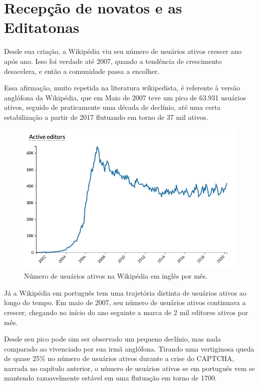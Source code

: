 \section{Recepção de novatos e as Editatonas}

Desde sua criação, a Wikipédia viu seu número de usuários ativos crescer ano após ano. Isso foi verdade até 2007, quando a tendência de crescimento desacelera, e então a comunidade passa a encolher.  \citep{halfaker_rise_2013}

Essa afirmação, muito repetida na literatura wikipedista, é referente à versão anglófona da Wikipédia, que em Maio de 2007 teve um pico de 63.931 usuários ativos, seguido de praticamente uma década de declínio, até uma certa estabilização a partir de 2017 flutuando em torno de 37 mil ativos. \citep{wikimedia_stats_active_editors_enwiki_2020}

\begin{figure}[hbt]
    \centering
    \includegraphics[width=1\textwidth]{Images/active_editors_enwiki.png}
    \caption{Número de usuários ativos na Wikipédia em inglês por mês. \citep{wikimedia_stats_active_editors_enwiki_2020} }
    \label{fig:active_editors_enwiki}
\end{figure}

Já a Wikipédia em português tem uma trajetória distinta de usuários ativos ao longo do tempo. Em maio de 2007, seu número de usuários ativos continuava a crescer, chegando no início do ano seguinte a marca de 2 mil editores ativos por mês. \citep{wikimedia_stats_active_editors_ptwiki_2020}

Desde seu pico pode sim ser observado um pequeno declínio, mas nada comparado ao vivenciado por sua irmã anglófona. Tirando uma vertiginosa queda de quase 25\% no número de usuários ativos durante a crise do CAPTCHA, narrada no capítulo anterior, o número de usuários ativos se em português vem se mantendo razoavelmente estável em uma flutuação em torno de 1700.

